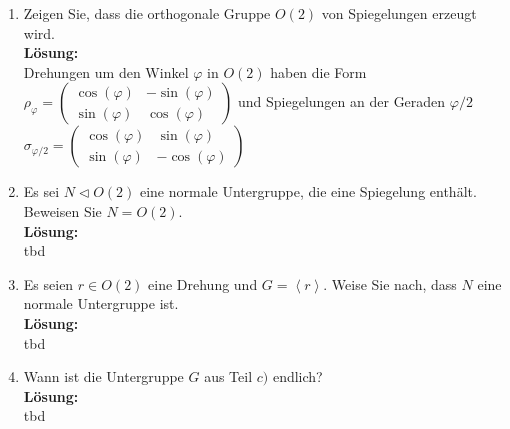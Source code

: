 \documentclass[11pt,a4paper,ngerman]{article}
\begin{document}
\begin{enumerate}[\bfseries a)]
\item Zeigen Sie, dass die orthogonale Gruppe $O(2)$ von Spiegelungen erzeugt wird.\\

\textbf{Lösung:}\\

Drehungen um den Winkel $\varphi$  in $O(2)$ haben die Form \\$\rho_{\varphi} = \begin{pmatrix} \cos (\varphi) & - \sin (\varphi) \\ \sin (\varphi) & \cos (\varphi) \end{pmatrix}$ und Spiegelungen an der Geraden $\varphi / 2 $ \\$\sigma_{\varphi / 2} = \begin{pmatrix} \cos (\varphi) & \sin (\varphi ) \\ \sin (\varphi ) & - \cos ( \varphi ) \end{pmatrix}$

\item Es sei $N \vartriangleleft O(2)$ eine normale Untergruppe, die eine Spiegelung enthält. Beweisen Sie $N = O(2)$.\\

\textbf{Lösung:}\\

tbd

\item Es seien $r \in O(2)$ eine Drehung und $G = \left< r \right>$. Weise Sie nach, dass $N$ eine normale Untergruppe ist.\\

\textbf{Lösung:}\\

tbd

\item Wann ist die Untergruppe $G$ aus Teil $c)$ endlich?\\

\textbf{Lösung:}\\

tbd

\end{enumerate}
\end{document}
